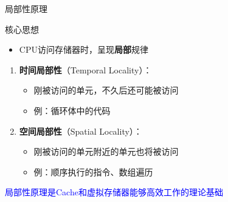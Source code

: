 \documentclass[10pt, aspectratio=169]{beamer}
\begin{document}
\begin{frame}{局部性原理}
    \begin{block}{核心思想}
        \begin{itemize}
            \item CPU访问存储器时，呈现\textbf{局部}规律
        \end{itemize}
    \end{block}
    \vspace{0.5em}
    \begin{enumerate}
        \item \textbf{时间局部性}（Temporal Locality）：
        \begin{itemize}
            \item 刚被访问的单元，不久后还可能被访问
            \item 例：循环体中的代码
        \end{itemize}
        \item \textbf{空间局部性}（Spatial Locality）：
        \begin{itemize}
            \item 刚被访问的单元附近的单元也将被访问
            \item 例：顺序执行的指令、数组遍历
        \end{itemize}
    \end{enumerate}
    \vspace{0.5em}
    \begin{center}
        \textcolor{blue}{局部性原理是Cache和虚拟存储器能够高效工作的理论基础}
    \end{center}
\end{frame}
\end{document}
